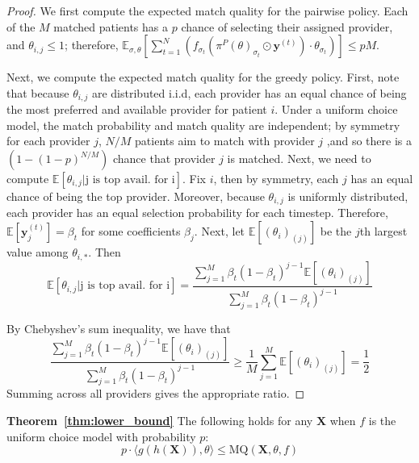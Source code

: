 \documentclass[11pt]{article}
\begin{document}
\thmgrouping* 
\begin{proof}
     
    We first compute the expected match quality for the pairwise policy. 
    Each of the $M$ matched patients has a $p$ chance of selecting their assigned provider, and $\theta_{i,j} \leq 1$; therefore, $\mathbb{E}_{\sigma,\theta}[\sum_{t=1}^{N}  (f_{\sigma_{t}}\left(\pi^{P}(\theta)_{\sigma_{t}} \odot \mathbf{y}^{(t)}\right) \cdot \theta_{\sigma_{t}})] \leq pM$.

    Next, we compute the expected match quality for the greedy policy. 
    First, note that because $\theta_{i,j}$ are distributed i.i.d, each provider has an equal chance of being the most preferred and available provider for patient $i$. 
    Under a uniform choice model, the match probability and match quality are independent; by symmetry for each provider $j$, $N/M$ patients aim to match with provider $j$ ,and so there is a $(1-(1-p)^{N/M})$ chance that provider $j$ is matched. 
    Next, we need to compute $\mathbb{E}[\theta_{i,j} | \text{j is top avail. for i}]$. 
    Fix $i$, then by symmetry, each $j$ has an equal chance of being the top provider. 
    Moreover, because $\theta_{i,j}$ is uniformly distributed, each provider has an equal selection probability for each timestep. 
    Therefore, $\mathbb{E}[\mathbf{y}^{(t)}_{j}] = \beta_{t}$ for some coefficients $\beta_{j}$. 
    Next, let $\mathbb{E}[(\theta_{i})_{(j)}]$ be the $j$th largest value among $\theta_{i,*}$. 
    Then
    \begin{equation}
        \mathbb{E}[\theta_{i,j} | \text{j is top avail. for i}] = \frac{\sum_{j=1}^{M} \beta_{t}(1-\beta_{t})^{j-1} \mathbb{E}[(\theta_{i})_{(j)}]}{\sum_{j=1}^{M} \beta_{t}(1-\beta_{t})^{j-1}}
    \end{equation}

    By Chebyshev's sum inequality, we have that 
    \begin{equation}
        \frac{\sum_{j=1}^{M} \beta_{t}(1-\beta_{t})^{j-1} \mathbb{E}[(\theta_{i})_{(j)}]}{\sum_{j=1}^{M} \beta_{t}(1-\beta_{t})^{j-1}} \geq \frac{1}{M} \sum_{j=1}^{M} \mathbb{E}[(\theta_{i})_{(j)}] = \frac{1}{2}
    \end{equation}
    Summing across all providers gives the appropriate ratio.  
\end{proof}

\textbf{Theorem~\ref{thm:lower_bound}}
The following holds for any $\mathbf{X}$ when $f$ is the uniform choice model with probability $p$:
{\small \begin{equation}
    p \cdot \langle g(h(\mathbf{X})), \theta \rangle \leq \mathrm{MQ}(\mathbf{X},\theta,f)
\end{equation}}
\end{document}
